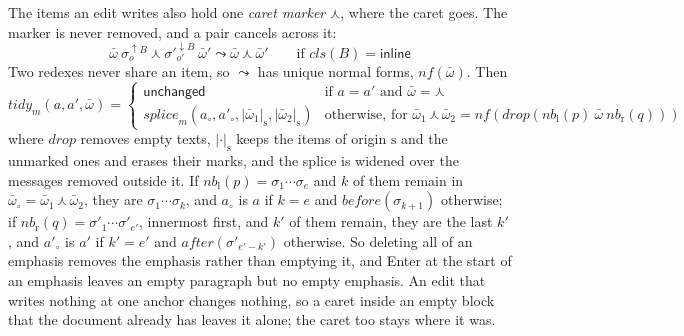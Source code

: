 \documentclass[11pt]{article}
\numberwithin{equation}{section}
\newcommand{\kw}[1]{\ensuremath{\mathsf{#1}}}
\newcommand{\crt}{\mathord{\curlywedge}}
\begin{document}
The items an edit writes also hold one \emph{caret marker} $\crt$, where the
caret goes.  The marker is never removed, and a pair cancels across it:
\begin{equation}\label{eq:tidy-caret}
\bar\omega\ \sigma^{\uparrow B}_{o}\ \crt\ \sigma'^{\downarrow B}_{o'}\
  \bar\omega' \leadsto \bar\omega\ \crt\ \bar\omega'
\qquad \text{if } \mathit{cls}(B) = \kw{inline}
\end{equation}
Two redexes never share an item, so $\leadsto$ has unique normal forms,
$\mathit{nf}(\bar\omega)$.  Then
\begin{equation}\label{eq:tidy}
\mathit{tidy}_m(a, a', \bar\omega) =
\begin{cases}
\kw{unchanged} & \text{if } a = a' \text{ and } \bar\omega = \crt \\
\mathit{splice}_m(a_\circ, a'_\circ, |\bar\omega_1|_{\mathrm{s}},
  |\bar\omega_2|_{\mathrm{s}}) &
  \text{otherwise, for } \bar\omega_1\,\crt\,\bar\omega_2 =
  \mathit{nf}(\mathit{drop}(\mathit{nb}_{\mathrm{l}}(p)\ \bar\omega\
  \mathit{nb}_{\mathrm{r}}(q)))
\end{cases}
\end{equation}
where $\mathit{drop}$ removes empty texts, $|\cdot|_{\mathrm{s}}$ keeps the
items of origin $\mathrm{s}$ and the unmarked ones and erases their marks,
and the splice is widened over the messages removed outside it.  If
$\mathit{nb}_{\mathrm{l}}(p) = \sigma_1 \cdots \sigma_e$ and $k$ of them
remain in $\bar\omega_\circ = \bar\omega_1\,\crt\,\bar\omega_2$, they are $\sigma_1 \cdots \sigma_k$, and
$a_\circ$ is $a$ if $k = e$ and $\mathit{before}(\sigma_{k+1})$ otherwise;
if $\mathit{nb}_{\mathrm{r}}(q) = \sigma'_1 \cdots \sigma'_{e'}$, innermost
first, and $k'$ of them remain, they are the last $k'$, and $a'_\circ$ is
$a'$ if $k' = e'$ and $\mathit{after}(\sigma'_{e'-k'})$ otherwise.  So
deleting all of an emphasis removes the emphasis rather than emptying it,
and Enter at the start of an emphasis leaves an empty paragraph but no
empty emphasis.  An edit that writes nothing at one anchor changes nothing,
so a caret inside an empty block that the document already has leaves it
alone; the caret too stays where it was.
\end{document}
